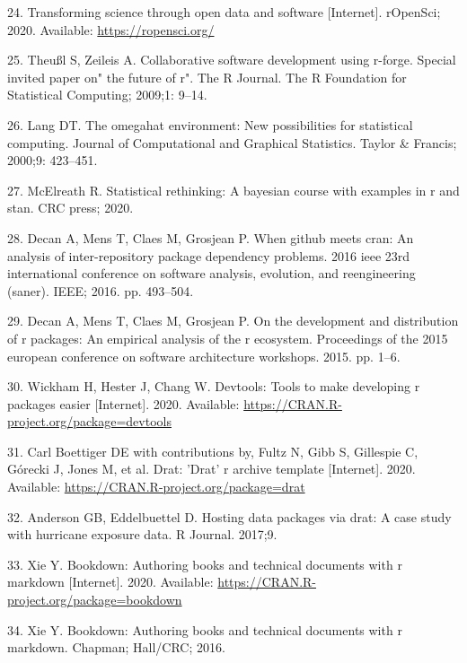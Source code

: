 \documentclass[10pt,letterpaper]{article}
\begin{document}
\leavevmode\hypertarget{ref-ropensci2020}{}%
24. Transforming science through open data and software {[}Internet{]}.
rOpenSci; 2020. Available: \url{https://ropensci.org/}

\leavevmode\hypertarget{ref-theussl2009}{}%
25. Theußl S, Zeileis A. Collaborative software development using
r-forge. Special invited paper on" the future of r". The R Journal. The
R Foundation for Statistical Computing; 2009;1: 9--14.

\leavevmode\hypertarget{ref-lang2000}{}%
26. Lang DT. The omegahat environment: New possibilities for statistical
computing. Journal of Computational and Graphical Statistics. Taylor \&
Francis; 2000;9: 423--451.

\leavevmode\hypertarget{ref-mcelreath2020}{}%
27. McElreath R. Statistical rethinking: A bayesian course with examples
in r and stan. CRC press; 2020.

\leavevmode\hypertarget{ref-decan2016}{}%
28. Decan A, Mens T, Claes M, Grosjean P. When github meets cran: An
analysis of inter-repository package dependency problems. 2016 ieee 23rd
international conference on software analysis, evolution, and
reengineering (saner). IEEE; 2016. pp. 493--504.

\leavevmode\hypertarget{ref-decan2015}{}%
29. Decan A, Mens T, Claes M, Grosjean P. On the development and
distribution of r packages: An empirical analysis of the r ecosystem.
Proceedings of the 2015 european conference on software architecture
workshops. 2015. pp. 1--6.

\leavevmode\hypertarget{ref-devtools}{}%
30. Wickham H, Hester J, Chang W. Devtools: Tools to make developing r
packages easier {[}Internet{]}. 2020. Available:
\url{https://CRAN.R-project.org/package=devtools}

\leavevmode\hypertarget{ref-drat}{}%
31. Carl Boettiger DE with contributions by, Fultz N, Gibb S, Gillespie
C, Górecki J, Jones M, et al. Drat: 'Drat' r archive template
{[}Internet{]}. 2020. Available:
\url{https://CRAN.R-project.org/package=drat}

\leavevmode\hypertarget{ref-anderson2017}{}%
32. Anderson GB, Eddelbuettel D. Hosting data packages via drat: A case
study with hurricane exposure data. R Journal. 2017;9.

\leavevmode\hypertarget{ref-bookdown}{}%
33. Xie Y. Bookdown: Authoring books and technical documents with r
markdown {[}Internet{]}. 2020. Available:
\url{https://CRAN.R-project.org/package=bookdown}

\leavevmode\hypertarget{ref-xie2016}{}%
34. Xie Y. Bookdown: Authoring books and technical documents with r
markdown. Chapman; Hall/CRC; 2016.
\end{document}
